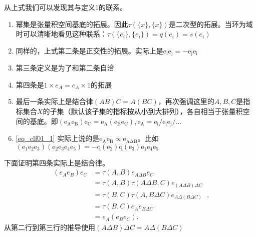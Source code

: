 从上式我们可以发现其与定义1的联系。
\begin{enumerate}
\item 幂集是张量积空间基底的拓展。因此$\tau(\{x\},\{x\})$是二次型的拓展。当环为域时可以清晰地看见这种联系：$\tau(\{e_i\},\{e_i\})=q(e_i)=s(e_i)$
\item 同样的，上式第二条是正交性的拓展。实际上是$\mathrm {e_ie_j=-e_je_i}$
\item 第三条定义是为了和第二条自洽
\item 第四条是$1\times e_A=e_A\times 1$的拓展
\item 最后一条实际上是结合律$(AB)C=A(BC)$，再次强调这里的$A,B,C$是指标集合$X$的子集（默认该子集的指标按从小到大排列），各自相当于张量积空间的基底。即$\mathrm {(e_Ae_B)e_C=e_A(e_Be_C),e_A=e_i/e_ie_j/...}$
\item \autoref{eq_clf01_1} 实际上说的是$\mathrm {e_A e_B\propto e_{A\Delta B}}$。比如$\mathrm {(e_{1}e_{2}e_{3})(e_{2}e_{3}e_{4}e_{5})=-q(e_2)q(e_3)e_1 e_4 e_5}$
\end{enumerate}

下面证明第四条实际上是结合律。
\begin{equation}
\begin{aligned}
\left(e_A e_B\right) e_C & =\tau(A, B) e_{A \Delta B} e_C \\
& =\tau(A, B) \tau(A \Delta B, C) e_{(A \Delta B) \Delta C} \\
& =\tau(B, C) \tau(A, B \Delta C) e_{A \Delta(B \Delta C)} \\
& =\tau(B, C) e_A e_{B \Delta C} \\
& =e_A\left(e_B e_C\right) .
\end{aligned}~,
\end{equation}
从第二行到第三行的推导使用$(A \Delta B) \Delta C=A \Delta(B \Delta C)$






